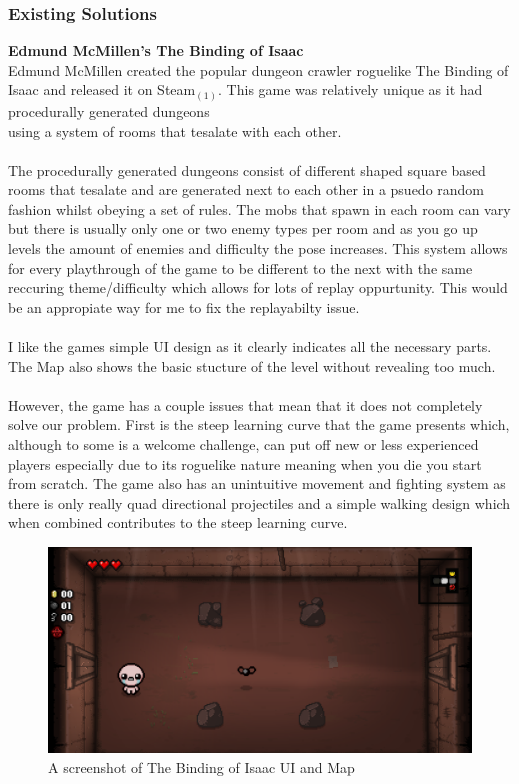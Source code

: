 \documentclass{article}
\begin{document}
        \subsubsection{Existing Solutions}
        \textbf{Edmund McMillen's The Binding of Isaac}\\
        Edmund McMillen created the popular dungeon crawler roguelike The Binding of Isaac and released it on Steam$_{(1)}$.
        This game was relatively unique as it had procedurally generated dungeons \\using a system of rooms that tesalate with each other.\\
        \\
        The procedurally generated dungeons consist of different shaped square based rooms that tesalate and are generated next to each other in a psuedo random fashion whilst obeying a set of rules. The mobs that spawn in each room can vary but there is usually only one or two enemy types per room and as you go up levels the amount of enemies and difficulty the pose increases. This system allows for every playthrough of the game to be different to the next with the same reccuring theme/difficulty which allows for lots of replay oppurtunity. This would be an appropiate way for me to fix the replayabilty issue.\\
        \\
        I like the games simple UI design as it clearly indicates all the necessary parts. The Map also shows the basic stucture of the level without revealing too much.\\
        \\
        However, the game has a couple issues that mean that it does not completely solve our problem. First is the steep learning curve that the game presents which, although to some is a welcome challenge, can put off new or less experienced players especially due to its roguelike nature meaning when you die you start from scratch. The game also has an unintuitive movement and fighting system as there is only really quad directional projectiles and a simple walking design which when combined contributes to the steep learning curve.\\
        \begin{figure}[h]
                \centering
                \includegraphics[scale=0.25]{images/research/BOI_Capture.PNG}
                \caption{A screenshot of The Binding of Isaac UI and Map}
        \end{figure}
\end{document}
